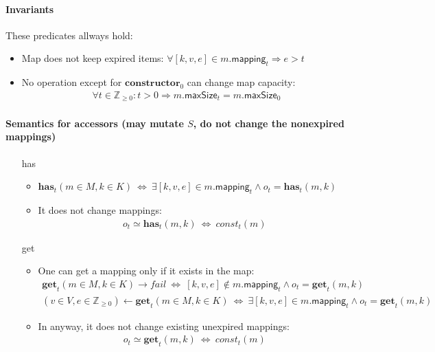 \documentclass{article}
\renewcommand{\o}[1]{\ensuremath{\mathbf{#1}}}
\newcommand{\p}[1]{\ensuremath{\mathit{#1}}}
\newcommand{\s}[1]{\ensuremath{\mathsf{#1}}}
\newcommand{\nintset}{\ensuremath{\mathds{Z}_{\ge 0}}}
\begin{document}
\paragraph{Invariants}
These predicates allways hold:
\begin{itemize}
\item Map does not keep expired items: $\forall [k, v, e] \in m.\s{mapping}_t \Rightarrow e > t$
\item No operation except for $\o{constructor}_0$ can change map capacity:
  \begin{gather*}
    \forall t\in \nintset: t > 0 \Rightarrow m.\s{maxSize}_t=m.\s{maxSize}_0
  \end{gather*}
\end{itemize}

\paragraph{Semantics for accessors (may mutate $S$, do not change the nonexpired mappings)}
\begin{itemize}
\item[has]
  \begin{itemize}
  \item $\o{has}_t(m \in M, k \in K) ~\Leftrightarrow~ \exists [k,v,e] \in m.\s{mapping}_t \wedge o_t=\o{has}_t(m, k)$\\
  \item It does not change mappings:
    \begin{gather*}
      o_t \simeq \o{has}_t(m, k) ~\Leftrightarrow~ \p{const}_t(m)
    \end{gather*}
  \end{itemize}
\item[get]
  \begin{itemize}
  \item One can get a mapping only if it exists in the map:
      \begin{gather}
        \o{get}_t(m \in M, k \in K) \rightarrow fail ~\Leftrightarrow~ [k,v,e] \not\in m.\s{mapping}_t \wedge o_t=\o{get}_t(m, k)\label{eq:get1}\\
        (v\in V,e\in \nintset)\gets \o{get}_t(m \in M, k \in K) ~\Leftrightarrow~ \exists [k,v,e] \in m.\s{mapping}_t \wedge o_t=\o{get}_t(m, k) \label{eq:get2}
      \end{gather}
  \item In anyway, it does not change existing unexpired mappings:
    \begin{gather*}
      o_t \simeq \o{get}_t(m, k) ~\Leftrightarrow~ \p{const}_t(m)
    \end{gather*}
  \end{itemize}
\end{itemize}
\end{document}
